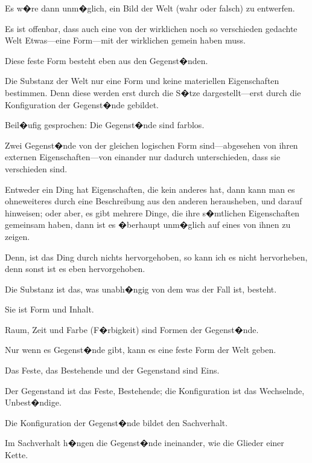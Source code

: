 {Es w�re dann unm�glich, ein Bild der Welt
(wahr oder falsch) zu entwerfen.}


{Es ist offenbar, dass auch eine von der wirklichen
noch so verschieden gedachte Welt Etwas---eine
Form---mit der wirklichen gemein haben muss.}


{Diese feste Form besteht eben aus den Gegenst�nden.}


{Die Substanz der Welt  nur eine Form und
keine materiellen Eigenschaften bestimmen. Denn
diese werden erst durch die S�tze dar\-ge\-stellt---erst
durch die Konfiguration der Gegenst�nde gebildet.}


{Beil�ufig gesprochen: Die Gegenst�nde sind
farblos.}


{Zwei Gegenst�nde von der gleichen logischen
Form sind---ab\-ge\-se\-hen von ihren externen Eigenschaften---von
einander nur dadurch unterschieden,
dass sie verschieden sind.}


{Entweder ein Ding hat Eigenschaften, die kein
anderes hat, dann kann man es ohneweiteres durch
eine Beschreibung aus den anderen herausheben,
und darauf hinweisen; oder aber, es gibt mehrere
Dinge, die ihre s�mtlichen Eigenschaften gemeinsam
haben, dann ist es �berhaupt unm�glich auf
eines von ihnen zu zeigen.

Denn, ist das Ding durch nichts hervorgehoben,
so kann ich es nicht hervorheben, denn sonst ist
es eben hervorgehoben.}


{Die Substanz ist das, was unabh�ngig von dem
was der Fall ist, besteht.}


{Sie ist Form und Inhalt.}


{Raum, Zeit und Farbe (F�rbigkeit) sind Formen
der Gegenst�nde.}


{Nur wenn es Gegenst�nde gibt, kann es eine
feste Form der Welt geben.}


{Das Feste, das Bestehende und der Gegenstand
sind Eins.}


{Der Gegenstand ist das Feste, Bestehende; die
Konfiguration ist das Wechselnde, Unbest�ndige.}


{Die Konfiguration der Gegenst�nde bildet den
Sachverhalt.}


{Im Sachverhalt h�ngen die Gegenst�nde ineinander,
wie die Glieder einer Kette.}


